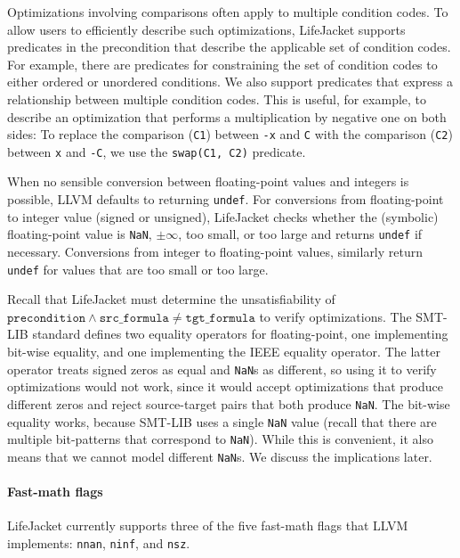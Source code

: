 \documentclass[preprint, numbers]{sigplanconf}
\newcommand{\xxx}{LifeJacket}
\begin{document}
Optimizations involving comparisons often apply to multiple condition codes. To
allow users to efficiently describe such optimizations, \xxx{} supports
predicates in the precondition that describe the applicable set of condition
codes. For example, there are predicates for constraining the set of condition
codes to either ordered or unordered conditions.  We also support predicates
that express a relationship between multiple condition codes. This is useful,
for example, to describe an optimization that performs a multiplication by
negative one on both sides: To replace the comparison (\texttt{C1}) between
\texttt{-x} and \texttt{C} with the comparison (\texttt{C2}) between \texttt{x}
and \texttt{-C}, we use the \texttt{swap(C1, C2)} predicate.

When no sensible conversion between floating-point values and integers is
possible, LLVM defaults to returning \texttt{undef}. For conversions from
floating-point to integer value (signed or unsigned), \xxx{} checks whether the
(symbolic) floating-point value is \texttt{NaN}, $\pm\infty$, too small, or too
large and returns \texttt{undef} if necessary. Conversions from integer to
floating-point values, similarly return \texttt{undef} for values that are too
small or too large.





Recall that \xxx{} must determine the unsatisfiability of
$\texttt{precondition} \wedge \texttt{src\_formula} \ne \texttt{tgt\_formula}$
to verify optimizations. The SMT-LIB standard defines two equality operators
for floating-point, one implementing bit-wise equality, and one implementing
the IEEE equality operator. The latter operator treats signed zeros as
equal and \texttt{NaN}s as different, so using it to verify optimizations would
not work, since it would accept optimizations that produce different zeros and
reject source-target pairs that both produce \texttt{NaN}. The bit-wise
equality works, because SMT-LIB uses a single \texttt{NaN} value (recall that
there are multiple bit-patterns that correspond to \texttt{NaN}). While this
is convenient, it also means that we cannot model different \texttt{NaN}s. We
discuss the implications later.

\paragraph{Fast-math flags}
\xxx{} currently supports three of the five fast-math flags that LLVM
implements: \texttt{nnan}, \texttt{ninf}, and
\texttt{nsz}.
\end{document}
